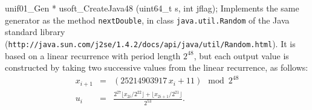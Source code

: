 unif01_Gen * usoft_CreateJava48 (uint64_t s, int jflag);
\endcode
  \tab
  Implements the same generator as the method {\tt nextDouble}, in
%
  class {\tt java.util.Random} of the Java standard library
  ({\tt {http://java.sun.com/j2se/1.4.2/docs/api/java/util/Random.html}}).
  It is based on a linear recurrence with period length $2^{48}$,
  but each output value is constructed by taking
  two successive values from the linear recurrence, as follows:
\begin{eqnarray*}
   x_{i+1} &=& (25214903917\, x_i + 11) \mod 2^{48} \\[6pt]
   u_i &=& \frac{2^{27}\lfloor x_{2i} / 2^{22} \rfloor
                    + \lfloor x_{2i+1} / 2^{21}\rfloor}{2^{53}}.
\end{eqnarray*}
\iffalse %
or equivalently
\begin{eqnarray*}
   u_i &=& \left[(27 << (x_{2i} >> 22)) + (x_{2i+1} >> 21)\right] / 2^{53}.
\end{eqnarray*}
if $<< p$ and $>> p$ represent the left shift and right shift of the
binary representation by $p$ positions, respectively.
\fi  %
\iffalse %
